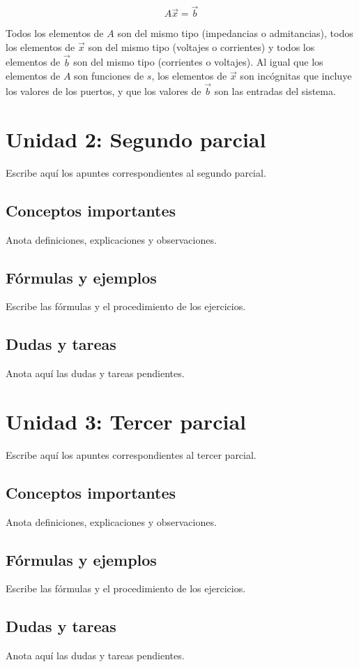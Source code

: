 \documentclass[12pt,letterpaper]{article}
\begin{document}
\[
    A\vec{x} = \vec{b}
\]

Todos los elementos de $A$ son del mismo tipo (impedancias o admitancias), todos los elementos de $\vec{x}$ son del mismo tipo (voltajes o corrientes) y todos los elementos de $\vec{b}$ son del mismo tipo (corrientes o voltajes). Al igual que los elementos de $A$ son funciones de $s$, los elementos de $\vec{x}$ son incógnitas que incluye los valores de los puertos, y que los valores de $\vec{b}$ son las entradas del sistema.

\newpage
\section{Unidad 2: Segundo parcial}
Escribe aquí los apuntes correspondientes al segundo parcial.

\subsection{Conceptos importantes}
Anota definiciones, explicaciones y observaciones.

\subsection{Fórmulas y ejemplos}
Escribe las fórmulas y el procedimiento de los ejercicios.

\subsection{Dudas y tareas}
Anota aquí las dudas y tareas pendientes.

\newpage
\section{Unidad 3: Tercer parcial}
Escribe aquí los apuntes correspondientes al tercer parcial.

\subsection{Conceptos importantes}
Anota definiciones, explicaciones y observaciones.

\subsection{Fórmulas y ejemplos}
Escribe las fórmulas y el procedimiento de los ejercicios.

\subsection{Dudas y tareas}
Anota aquí las dudas y tareas pendientes.
\end{document}
